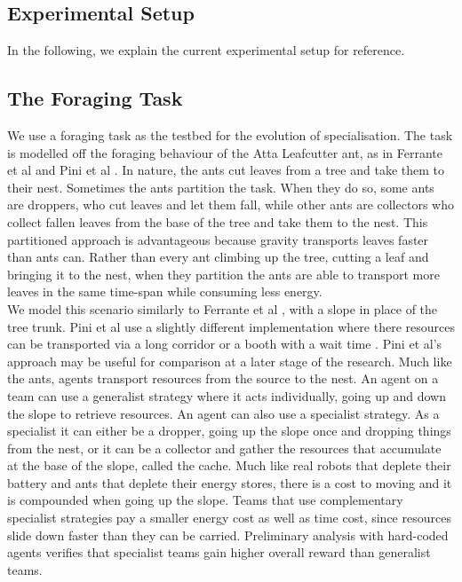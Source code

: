 \documentclass[12pt]{article}
\begin{document}
\begin{appendices}

\section{Experimental Setup}

In the following, we explain the current experimental setup for reference.

\subsection{The Foraging Task}\label{task_description}

We use a foraging task as the testbed for the evolution of specialisation.
The task is modelled off the foraging behaviour of the Atta Leafcutter ant, as in Ferrante et al \cite{ferrante:PLOS_CB:2015} and Pini et al \cite{pini:ICSI:2012, pini:Swarm_Intelligence:2011}.
In nature, the ants cut leaves from a tree and take them to their nest. 
Sometimes the ants partition the task. 
When they do so, some ants are droppers, who cut leaves and let them fall, while other ants are collectors who collect fallen leaves from the base of the tree and take them to the nest.
This partitioned approach is advantageous because gravity transports leaves faster than ants can.
Rather than every ant climbing up the tree, cutting a leaf and bringing it to the nest, when they partition the ants are able to transport more leaves in the same time-span while consuming less energy.\\

We model this scenario similarly to Ferrante et al \cite{ferrante:PLOS_CB:2015}, with a slope in place of the tree trunk. 
Pini et al use a slightly different implementation where there resources can be transported via a long corridor or a booth with a wait time \cite{pini:ICSI:2012, pini:Swarm_Intelligence:2011}. 
Pini et al's approach may be useful for comparison at a later stage of the research.
Much like the ants, agents transport resources from the source to the nest.
An agent on a team can use a generalist strategy where it acts individually, going up and down the slope to retrieve resources.
An agent can also use a specialist strategy. 
As a specialist it can either be a dropper, going up the slope once and dropping things from the nest, or it can be a collector and gather the resources that accumulate at the base of the slope, called the cache.
Much like real robots that deplete their battery and ants that deplete their energy stores, there is a cost to moving and it is compounded when going up the slope. 
Teams that use complementary specialist strategies pay a smaller energy cost as well as time cost, since resources slide down faster than they can be carried. 
Preliminary analysis with hard-coded agents verifies that specialist teams gain higher overall reward than generalist teams.\\


\end{appendices}
\end{document}
